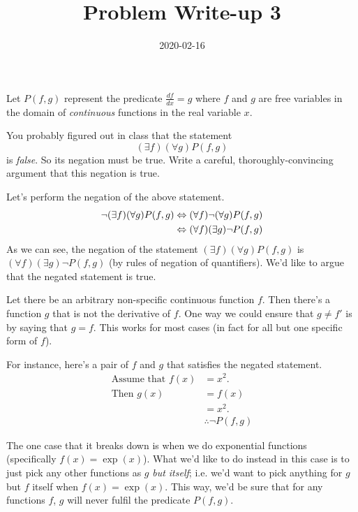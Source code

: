 \documentclass[a4paper,12pt]{article}
\title{Problem Write-up 3}
\date{2020-02-16}
\begin{document}
    \begin{problem}
        Let \(P(f,g)\) represent the predicate \(\frac{df}{dx} = g\) where \(f\) and \(g\) are free variables in the domain of \emph{continuous} functions in the real variable \(x\).

        You probably figured out in class that the statement \[(\exists f)(\forall g) P(f,g)\] is \emph{false}. So its negation must be true. Write a careful, thoroughly-convincing argument that this negation is true.

    \end{problem}
    \begin{answer}
        Let's perform the negation of the above statement.
        \begin{align*}
            \neg (\exists f)(\forall g) P(f,g) &\Leftrightarrow (\forall f) \neg (\forall g) P(f,g) \\
            &\Leftrightarrow (\forall f) (\exists g) \neg P(f,g)
        \end{align*}
        As we can see, the negation of the statement \((\exists f)(\forall g) P(f,g)\) is \((\forall f) (\exists g) \neg P(f,g)\) (by rules of negation of quantifiers). We'd like to argue that the negated statement is true.

        Let there be an arbitrary non-specific continuous function \(f\). Then there's a function \(g\) that is not the derivative of \(f\). One way we could ensure that \(g \not= f'\) is by saying that \(g = f\). This works for most cases (in fact for all but one specific form of \(f\)).

        For instance, here's a pair of \(f\) and \(g\) that satisfies the negated statement.
        \begin{align*}
            \text{Assume that } f(x) &= x^2. \\
            \text{Then } g(x) &= f(x) \\
            &= x^2. \\
            &\therefore \neg P(f,g)
        \end{align*}

        The one case that it breaks down is when we do exponential functions (specifically \(f(x) = \exp(x)\)). What we'd like to do instead in this case is to just pick any other functions as \(g\) \emph{but itself}; i.e. we'd want to pick anything for \(g\) but \(f\) itself when \(f(x) = \exp(x)\). This way, we'd be sure that for any functions \(f\), \(g\) will never fulfil the predicate \(P(f,g)\).
    \end{answer}
\end{document}
